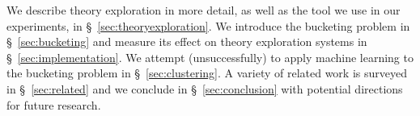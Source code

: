 We describe theory exploration in more detail, as well as the \qspec{} tool we
use in our experiments, in \S~\ref{sec:theoryexploration}. We introduce the
bucketing problem in \S~\ref{sec:bucketing} and measure its effect on theory
exploration systems in \S~\ref{sec:implementation}. We attempt (unsuccessfully)
to apply machine learning to the bucketing problem in \S~\ref{sec:clustering}.
A variety of related work is surveyed in \S~\ref{sec:related} and we conclude in
\S~\ref{sec:conclusion} with potential directions for future research.
